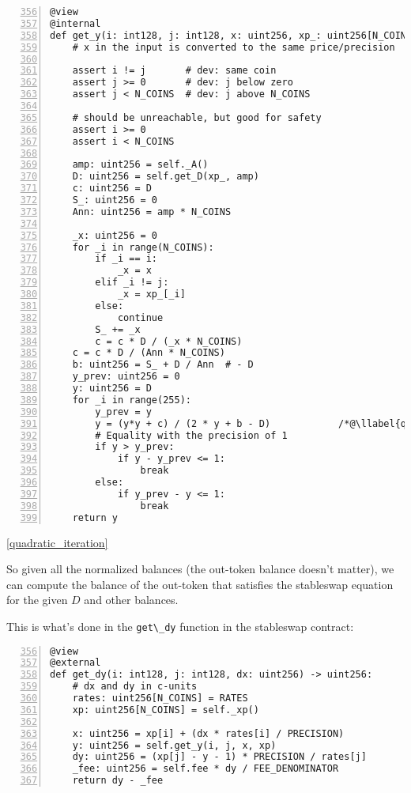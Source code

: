 \documentclass[
]{article}
\makeatletter
\newcommand{\passthrough}[1]{#1}
\newcounter{llabel}[lstlisting]%
\renewcommand*{\thellabel}{%
    \ifnum\value{llabel}<0 %
      \@ctrerr
    \else
      \ifnum\value{llabel}>10 %
        \@ctrerr
      \else
        \protect\footnotesize\ding{\the\numexpr\value{llabel}+201\relax}%
      \fi
    \fi
  }%
\newlength{\llabelsep}
\newcommand*{\llabel}[1]{%
  \begingroup
    \refstepcounter{llabel}%
    \label{#1}%
    \llap{%
      \thellabel\kern\llabelsep
      \hphantom{\lst@numberstyle\the\lst@lineno}%
      \kern\lst@numbersep
    }%
  \endgroup
}
\makeatother
\begin{document}
\begin{lstlisting}[numbers=left, firstnumber=356, label=get_y]
@view
@internal
def get_y(i: int128, j: int128, x: uint256, xp_: uint256[N_COINS]) -> uint256:
    # x in the input is converted to the same price/precision

    assert i != j       # dev: same coin
    assert j >= 0       # dev: j below zero
    assert j < N_COINS  # dev: j above N_COINS

    # should be unreachable, but good for safety
    assert i >= 0
    assert i < N_COINS

    amp: uint256 = self._A()
    D: uint256 = self.get_D(xp_, amp)
    c: uint256 = D
    S_: uint256 = 0
    Ann: uint256 = amp * N_COINS

    _x: uint256 = 0
    for _i in range(N_COINS):
        if _i == i:
            _x = x
        elif _i != j:
            _x = xp_[_i]
        else:
            continue
        S_ += _x
        c = c * D / (_x * N_COINS)
    c = c * D / (Ann * N_COINS)
    b: uint256 = S_ + D / Ann  # - D
    y_prev: uint256 = 0
    y: uint256 = D
    for _i in range(255):
        y_prev = y
        y = (y*y + c) / (2 * y + b - D)            /*@\llabel{quadratic_iteration}@*/
        # Equality with the precision of 1
        if y > y_prev:
            if y - y_prev <= 1:
                break
        else:
            if y_prev - y <= 1:
                break
    return y
\end{lstlisting}

\ref{quadratic_iteration}

So given all the normalized balances (the out-token balance doesn't
matter), we can compute the balance of the out-token that satisfies the
stableswap equation for the given \(D\) and other balances.

This is what's done in the \passthrough{\lstinline!get\_dy!} function in
the stableswap contract:

\begin{lstlisting}[numbers=left, firstnumber=356, label=get_dy]
@view
@external
def get_dy(i: int128, j: int128, dx: uint256) -> uint256:
    # dx and dy in c-units
    rates: uint256[N_COINS] = RATES
    xp: uint256[N_COINS] = self._xp()

    x: uint256 = xp[i] + (dx * rates[i] / PRECISION)
    y: uint256 = self.get_y(i, j, x, xp)
    dy: uint256 = (xp[j] - y - 1) * PRECISION / rates[j]
    _fee: uint256 = self.fee * dy / FEE_DENOMINATOR
    return dy - _fee
\end{lstlisting}
\end{document}
